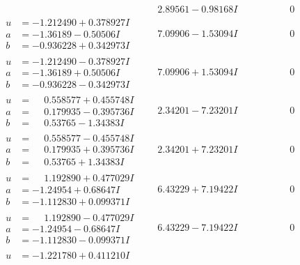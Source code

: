 \documentclass[1p]{elsarticle_modified}
\theoremstyle{definition}
\begin{document}
$$\begin{array}{c|c|c}
 & \phantom{-}2.89561 - 0.98168 I & \phantom{-0.000000 } 0 \\ \hline\begin{aligned}
u &= -1.212490 + 0.378927 I \\
a &= -1.36189 - 0.50506 I \\
b &= -0.936228 + 0.342973 I\end{aligned}
 & \phantom{-}7.09906 - 1.53094 I & \phantom{-0.000000 } 0 \\ \hline\begin{aligned}
u &= -1.212490 - 0.378927 I \\
a &= -1.36189 + 0.50506 I \\
b &= -0.936228 - 0.342973 I\end{aligned}
 & \phantom{-}7.09906 + 1.53094 I & \phantom{-0.000000 } 0 \\ \hline\begin{aligned}
u &= \phantom{-}0.558577 + 0.455748 I \\
a &= \phantom{-}0.179935 - 0.395736 I \\
b &= \phantom{-}0.53765 - 1.34383 I\end{aligned}
 & \phantom{-}2.34201 - 7.23201 I & \phantom{-0.000000 } 0 \\ \hline\begin{aligned}
u &= \phantom{-}0.558577 - 0.455748 I \\
a &= \phantom{-}0.179935 + 0.395736 I \\
b &= \phantom{-}0.53765 + 1.34383 I\end{aligned}
 & \phantom{-}2.34201 + 7.23201 I & \phantom{-0.000000 } 0 \\ \hline\begin{aligned}
u &= \phantom{-}1.192890 + 0.477029 I \\
a &= -1.24954 + 0.68647 I \\
b &= -1.112830 + 0.099371 I\end{aligned}
 & \phantom{-}6.43229 + 7.19422 I & \phantom{-0.000000 } 0 \\ \hline\begin{aligned}
u &= \phantom{-}1.192890 - 0.477029 I \\
a &= -1.24954 - 0.68647 I \\
b &= -1.112830 - 0.099371 I\end{aligned}
 & \phantom{-}6.43229 - 7.19422 I & \phantom{-0.000000 } 0 \\ \hline\begin{aligned}
u &= -1.221780 + 0.411210 I \\

\end{aligned}
\end{array}$$
\end{document}
